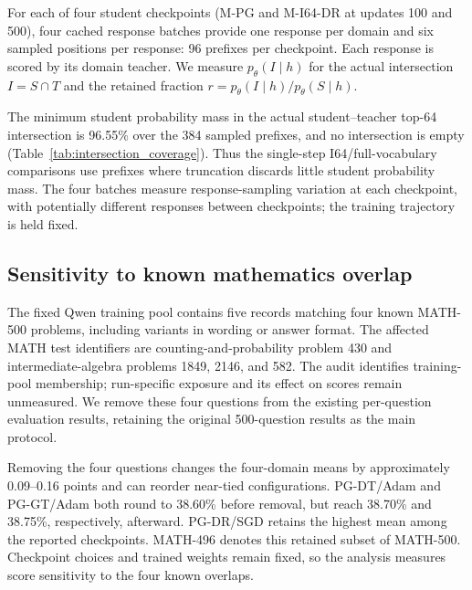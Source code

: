 For each of four student checkpoints (M-PG and M-I64-DR at updates 100 and 500), four cached response batches provide one response per domain and six sampled positions per response: 96 prefixes per checkpoint. Each response is scored by its domain teacher. We measure $p_\theta(I\mid h)$ for the actual intersection $I=S\cap T$ and the retained fraction $r=p_\theta(I\mid h)/p_\theta(S\mid h)$.



The minimum student probability mass in the actual student--teacher top-64 intersection is 96.55\% over the 384 sampled prefixes, and no intersection is empty (Table~\ref{tab:intersection_coverage}). Thus the single-step I64/full-vocabulary comparisons use prefixes where truncation discards little student probability mass. The four batches measure response-sampling variation at each checkpoint, with potentially different responses between checkpoints; the training trajectory is held fixed.

\subsection{Sensitivity to known mathematics overlap}
\label{app:math_overlap_sensitivity}

The fixed Qwen training pool contains five records matching four known MATH-500 problems, including variants in wording or answer format. The affected MATH test identifiers are counting-and-probability problem 430 and intermediate-algebra problems 1849, 2146, and 582. The audit identifies training-pool membership; run-specific exposure and its effect on scores remain unmeasured. We remove these four questions from the existing per-question evaluation results, retaining the original 500-question results as the main protocol.



Removing the four questions changes the four-domain means by approximately 0.09--0.16 points and can reorder near-tied configurations. PG-DT/Adam and PG-GT/Adam both round to 38.60\% before removal, but reach 38.70\% and 38.75\%, respectively, afterward. PG-DR/SGD retains the highest mean among the reported checkpoints. MATH-496 denotes this retained subset of MATH-500. Checkpoint choices and trained weights remain fixed, so the analysis measures score sensitivity to the four known overlaps.

